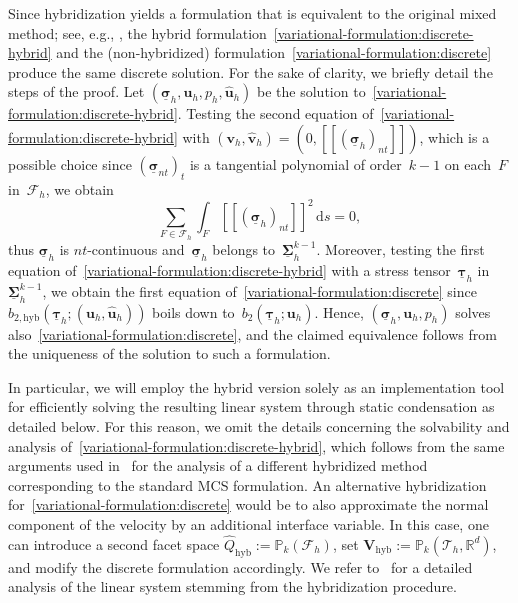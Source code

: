 \documentclass[a4paper,twoside,10pt]{article}
\theoremstyle{plain}
\theoremstyle{remark}
\theoremstyle{definition}
\numberwithin{equation}{section}
\numberwithin{figure}{section}
\newcommand{\jump}[1]{\left[\!\left[#1\right]\!\right]}
\newcommand{\Pbbk}{\mathbb{P}_k}
\newcommand{\Tauh}{\mathcal{T}_h}
\newcommand{\Rbbd}{\mathbb{R}^d}
\newcommand{\F}{F}
\newcommand{\Sigmah}{\underline{\boldsymbol{\Sigma}}_h}
\newcommand{\Sigmahkmo}{\Sigmah^{k-1}}
\newcommand{\taubfh}{\underline{\boldsymbol{\tau}}_h}
\newcommand{\vbfh}{\mathbf{v}_h}
\newcommand{\sigmabfh}{\underline{\boldsymbol{\sigma}}_h}
\newcommand{\ubfh}{\mathbf{u}_h}
\newcommand{\ph}{p_h}
\newcommand{\vbf}{\mathbf{v}}
\newcommand{\sigmabf}{\underline{\boldsymbol{\sigma}}}
\newcommand{\ubf}{\mathbf{u}}
\newcommand{\normtang}{{nt}}
\newcommand{\Fcalh}{\mathcal{F}_h}
\newcommand{\ds}{\, \mathrm{d}s}
\newcommand{\btwo}{b_2}
\newcommand{\sigmabfnt}{\sigmabf_{n t}}
\newcommand{\Vbf}{\mathbf{V}}
\newcommand{\HDG}{\text{hyb}}
\newcommand{\VHDG}{\Vbf_{\HDG}}
\newcommand{\QhatHDG}{\widehat{Q}_{\HDG}}
\newcommand{\vhhat}{\hat{\vbf}_h}
\newcommand{\uhhat}{\hat{\ubf}_h}
\newcommand{\btwohyb}{b_{2,\text{hyb}}}
\begin{document}
Since hybridization yields a formulation that is equivalent
to the original mixed method;
see, e.g., \cite[Ch.~7.2.2]{Boffi-Brezzi-Fortin:2013},
the hybrid formulation~\eqref{variational-formulation:discrete-hybrid}
and the (non-hybridized) formulation~\eqref{variational-formulation:discrete}
produce the same discrete solution.
For the sake of clarity,
we briefly detail the steps of the proof. 
Let $(\sigmabfh,\ubfh,\ph, \uhhat)$ be the solution to~\eqref{variational-formulation:discrete-hybrid}.
Testing the second equation of~\eqref{variational-formulation:discrete-hybrid}
with $(\vbfh, \vhhat) = (0, \jump{(\sigmabfh)_{\normtang}})$,
which is a possible choice since
$(\sigmabfnt)_{t}$ is a tangential polynomial of order~$k-1$ on each~$\F$ in~$\Fcalh$,
we obtain
\begin{equation*}
\sum_{\F \in \Fcalh} \int_{\F} \jump{(\sigmabfh)_{\normtang}}^2 \ds = 0,
\end{equation*}
thus $\sigmabfh$ is $\normtang$-continuous and~$\sigmabfh$ belongs to~$\Sigmahkmo$.
Moreover,
testing the first equation of~\eqref{variational-formulation:discrete-hybrid}
with a stress tensor~$\taubfh$ in~$\Sigmahkmo$,
we obtain the first equation of~\eqref{variational-formulation:discrete}
since~$\btwohyb(\taubfh; (\ubfh,\uhhat))$ boils down to~$\btwo(\taubfh; \ubfh)$.
Hence,
$(\sigmabfh,\ubfh,\ph)$ solves also~\eqref{variational-formulation:discrete},
and the claimed equivalence follows from the uniqueness of the solution to such a formulation.

In particular,
we will employ the hybrid version solely as an implementation tool
for efficiently solving the resulting linear system
through static condensation as detailed below.
For this reason,
we omit the details concerning the solvability
and analysis of~\eqref{variational-formulation:discrete-hybrid},
which follows from the same arguments used in~\cite{Gopalakrishnan-Kogler-Lederer-Schoberl:2023}
for the analysis of a different hybridized method
corresponding to the standard MCS formulation.
An alternative hybridization for~\eqref{variational-formulation:discrete} would be to
also approximate the normal component of the velocity by an additional interface variable.
In this case,
one can introduce a second facet space
$\QhatHDG := \Pbbk(\Fcalh)$,
set $\VHDG := \Pbbk(\Tauh,\Rbbd)$,
and modify the discrete formulation accordingly.
We refer to~\cite{Rhebergen-Wells:2018,Rhebergen-Wells:2022}
for a detailed analysis of the linear system stemming from the hybridization procedure.
\end{document}
